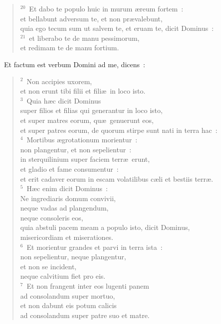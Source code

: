 \begin{flushleft}
\begin{verse}
${}^{20}$~Et dabo te populo huic in murum \ae reum fortem~:\\ et bellabunt adversum te, et non pr\ae valebunt,\\ quia ego tecum sum ut salvem te, et eruam te, dicit Dominus~:\\
${}^{21}$~et liberabo te de manu pessimorum,\\ et redimam te de manu fortium.\end{verse}\end{flushleft}


~Et factum est verbum Domini ad me, dicens~:
\begin{flushleft}\begin{verse}\vspace{6pt}${}^{2}$~Non accipies uxorem,\\ et non erunt tibi filii et fili\ae\ in loco isto.\\
${}^{3}$~Quia h\ae c dicit Dominus\\ super filios et filias qui generantur in loco isto,\\ et super matres eorum, qu\ae\ genuerunt eos,\\ et super patres eorum, de quorum stirpe sunt nati in terra hac~:\\
${}^{4}$~Mortibus \ae grotationum morientur~:\\ non plangentur, et non sepelientur~:\\ in sterquilinium super faciem terr\ae\ erunt,\\ et gladio et fame consumentur~:\\ et erit cadaver eorum in escam volatilibus c\ae li et bestiis terr\ae .\\
${}^{5}$~H\ae c enim dicit Dominus~:\\ Ne ingrediaris domum convivii,\\ neque vadas ad plangendum,\\ neque consoleris eos,\\ quia abstuli pacem meam a populo isto, dicit Dominus,\\ misericordiam et miserationes.\\
${}^{6}$~Et morientur grandes et parvi in terra ista~:\\ non sepelientur, neque plangentur,\\ et non se incident,\\ neque calvitium fiet pro eis.\\
${}^{7}$~Et non frangent inter eos lugenti panem\\ ad consolandum super mortuo,\\ et non dabunt eis potum calicis\\ ad consolandum super patre suo et matre.\\

\end{verse}
\end{flushleft}

